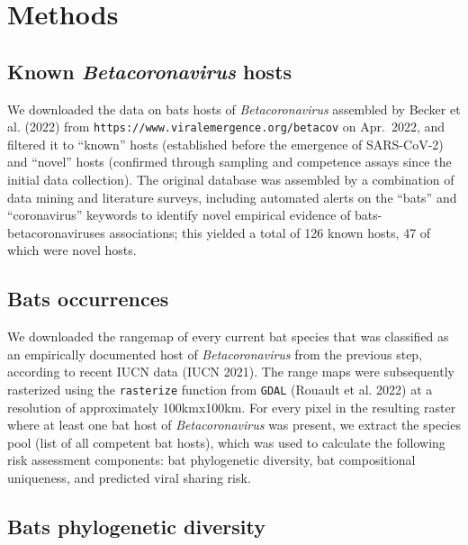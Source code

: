 \documentclass[11pt]{article}
\begin{document}
\hypertarget{methods}{%
\section{Methods}\label{methods}}

\hypertarget{known-betacoronavirus-hosts}{%
\subsection{\texorpdfstring{Known \emph{Betacoronavirus}
hosts}{Known Betacoronavirus hosts}}\label{known-betacoronavirus-hosts}}

We downloaded the data on bats hosts of \emph{Betacoronavirus} assembled
by Becker et al. (2022) from
\texttt{https://www.viralemergence.org/betacov} on Apr.~2022, and
filtered it to ``known'' hosts (established before the emergence of
SARS-CoV-2) and ``novel'' hosts (confirmed through sampling and
competence assays since the initial data collection). The original
database was assembled by a combination of data mining and literature
surveys, including automated alerts on the ``bats'' and ``coronavirus''
keywords to identify novel empirical evidence of bats-betacoronaviruses
associations; this yielded a total of 126 known hosts, 47 of which were
novel hosts.

\hypertarget{bats-occurrences}{%
\subsection{Bats occurrences}\label{bats-occurrences}}

We downloaded the rangemap of every current bat species that was
classified as an empirically documented host of \emph{Betacoronavirus}
from the previous step, according to recent IUCN data (IUCN 2021). The
range maps were subsequently rasterized using the \texttt{rasterize}
function from \texttt{GDAL} (Rouault et al. 2022) at a resolution of
approximately 100kmx100km. For every pixel in the resulting raster where
at least one bat host of \emph{Betacoronavirus} was present, we extract
the species pool (list of all competent bat hosts), which was used to
calculate the following risk assessment components: bat phylogenetic
diversity, bat compositional uniqueness, and predicted viral sharing
risk.

\hypertarget{bats-phylogenetic-diversity}{%
\subsection{Bats phylogenetic
diversity}\label{bats-phylogenetic-diversity}}
\end{document}
